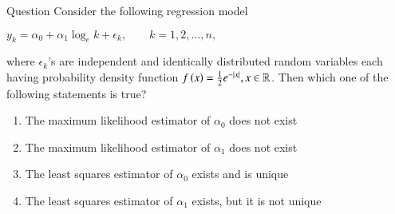\documentclass{beamer}
\begin{document}
\newenvironment{amatrix}[1]{%
  \left(\begin{array}{@{}*{#1}{c}|c@{}}
}{%
  \end{array}\right)
}
\newcommand{\cosec}{\,\text{cosec}\,}
\providecommand{\dec}[2]{\ensuremath{\overset{#1}{\underset{#2}{\gtrless}}}}
\newcommand{\myvec}[1]{\ensuremath{\begin{pmatrix}#1\end{pmatrix}}}
\newcommand{\mydet}[1]{\ensuremath{\begin{vmatrix}#1\end{vmatrix}}}
\newcommand{\myaugvec}[2]{\ensuremath{\begin{amatrix}{#1}#2\end{amatrix}}}
\providecommand{\rank}{\text{rank}}
\providecommand{\pr}[1]{\ensuremath{\Pr\left(#1\right)}}
\providecommand{\qfunc}[1]{\ensuremath{Q\left(#1\right)}}
	\newcommand*{\permcomb}[4][0mu]{{{}^{#3}\mkern#1#2_{#4}}}
\newcommand*{\perm}[1][-3mu]{\permcomb[#1]{P}}
\newcommand*{\comb}[1][-1mu]{\permcomb[#1]{C}}
\providecommand{\qfunc}[1]{\ensuremath{Q\left(#1\right)}}
\providecommand{\gauss}[2]{\mathcal{N}\ensuremath{\left(#1,#2\right)}}
\providecommand{\diff}[2]{\ensuremath{\frac{d{#1}}{d{#2}}}}
\providecommand{\myceil}[1]{\left \lceil #1 \right \rceil }
\newcommand\figref{Fig.~\ref}
\newcommand\tabref{Table~\ref}
\newcommand{\sinc}{\,\text{sinc}\,}
\newcommand{\rect}{\,\text{rect}\,}

\begin{frame}
  \titlepage
\end{frame}


\begin{frame}{Question}
Consider the following regression model
\begin{center}
	$y_{k} = \alpha_{0} + \alpha_{1} \log_{e}k + \epsilon_{k}, \qquad k = 1,2,…,n,$\\
\end{center}
where $\epsilon_{k}$'s are independent and identically distributed random variables each
having probability density function $ f\left(x\right) = \frac{1}{2} e^{-|x|}, x \in \mathbb{R}$. Then which one of
the following statements is true? 
\begin{enumerate}
	\item The maximum likelihood estimator of $\alpha_{0}$ does not exist
	\item The maximum likelihood estimator of $\alpha_{1}$ does not exist
	\item The least squares estimator of $\alpha_{0}$ exists and is unique
	\item The least squares estimator of $\alpha_{1}$ exists, but it is not unique
\end{enumerate}
\end{frame}
\end{document}
